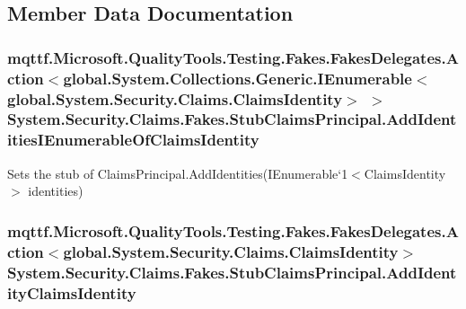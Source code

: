 \subsection{Member Data Documentation}
\hypertarget{class_system_1_1_security_1_1_claims_1_1_fakes_1_1_stub_claims_principal_a96c573e6c9d01dd90fdc5cd1c945bdfb}{
\subsubsection[{Add\-Identities\-I\-Enumerable\-Of\-Claims\-Identity}]{\setlength{\rightskip}{0pt plus 5cm}mqttf.\-Microsoft.\-Quality\-Tools.\-Testing.\-Fakes.\-Fakes\-Delegates.\-Action$<$global.\-System.\-Collections.\-Generic.\-I\-Enumerable$<$global.\-System.\-Security.\-Claims.\-Claims\-Identity$>$ $>$ System.\-Security.\-Claims.\-Fakes.\-Stub\-Claims\-Principal.\-Add\-Identities\-I\-Enumerable\-Of\-Claims\-Identity}}\label{class_system_1_1_security_1_1_claims_1_1_fakes_1_1_stub_claims_principal_a96c573e6c9d01dd90fdc5cd1c945bdfb}


Sets the stub of Claims\-Principal.\-Add\-Identities(I\-Enumerable`1$<$Claims\-Identity$>$ identities)

\hypertarget{class_system_1_1_security_1_1_claims_1_1_fakes_1_1_stub_claims_principal_a50b9dbdc0c22b28c6703b31894ac6457}{
\subsubsection[{Add\-Identity\-Claims\-Identity}]{\setlength{\rightskip}{0pt plus 5cm}mqttf.\-Microsoft.\-Quality\-Tools.\-Testing.\-Fakes.\-Fakes\-Delegates.\-Action$<$global.\-System.\-Security.\-Claims.\-Claims\-Identity$>$ System.\-Security.\-Claims.\-Fakes.\-Stub\-Claims\-Principal.\-Add\-Identity\-Claims\-Identity}}\label{class_system_1_1_security_1_1_claims_1_1_fakes_1_1_stub_claims_principal_a50b9dbdc0c22b28c6703b31894ac6457}


